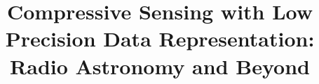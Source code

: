 \documentclass[article]{imsart}
\begin{document}
\begin{frontmatter}
\title{Compressive Sensing with
Low Precision Data Representation: Radio Astronomy and Beyond}






\end{frontmatter}
\end{document}
